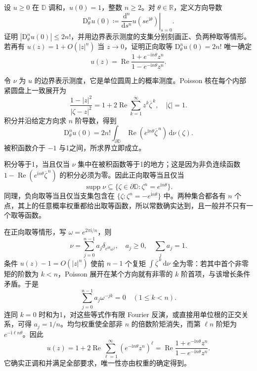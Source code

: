 \begin{exercise}[正调和函数的高阶方向导数]\label{b3:ex:15-draft-07}
设 \(u\ge0\) 在 \(\mathbb D\) 调和，\(u(0)=1\)，整数 \(n\ge2\)。对 \(\theta\in\mathbb R\)，定义方向导数
\[
 \mathrm D_\theta^n u(0)
 \coloneqq\left.\frac{\mathrm d^n}{\mathrm ds^n}u(se^{\mathrm i\theta})\right|_{s=0}.
\]
证明 \(|\mathrm D_\theta^n u(0)|\le2n!\)，并用边界表示测度的支集分别刻画正、负两种取等情形。若再有 \(u(z)=1+O(|z|^n)\) 当 \(z\to0\)，证明正向取等 \(\mathrm D_\theta^n u(0)=2n!\) 唯一确定
\[
 u(z)=\operatorname{Re}\frac{1+e^{-\mathrm in\theta}z^n}{1-e^{-\mathrm in\theta}z^n}.
\]
\end{exercise}
\begin{solution}
令 \(\nu\) 为 \(u\) 的边界表示测度，它是单位圆周上的概率测度。Poisson 核在每个内部紧圆盘上一致展开为
\[
 \frac{1-|z|^2}{|\zeta-z|^2}
 =1+2\operatorname{Re}\sum_{k=1}^\infty z^k\overline\zeta^{\,k},
 \quad |\zeta|=1.
\]
积分并沿给定方向求 \(n\) 阶导数，得到
\[
 \mathrm D_\theta^n u(0)
 =2n!\int_{\partial\mathbb D}
       \operatorname{Re}(e^{\mathrm in\theta}\overline\zeta^{\,n})\,\mathrm d\nu(\zeta).
\]
被积函数介于 \(-1\) 与1之间，所求界立即成立。

积分等于1，当且仅当 \(\nu\) 集中在被积函数等于1的地方；这是因为非负连续函数 \(1-\operatorname{Re}(e^{\mathrm in\theta}\overline\zeta^{\,n})\) 的积分必须为零。因此正向取等当且仅当
\[
 \operatorname{supp}\nu\subseteq
 \{\zeta\in\partial\mathbb D:\zeta^n=e^{\mathrm in\theta}\}.
\]
同理，负向取等当且仅当支集包含在 \(\{\zeta:\zeta^n=-e^{\mathrm in\theta}\}\) 中。两种集合都各有 \(n\) 个点，其上的任意概率权重都给出取等函数，所以常数确实达到，且一般并不只有一个取等函数。

在正向取等情形，写 \(\omega=e^{2\pi\mathrm i/n}\)，则
\[
 \nu=\sum_{j=0}^{n-1}a_j\delta_{e^{\mathrm i\theta}\omega^j},
 \quad a_j\ge0,\quad\sum_j a_j=1.
\]
条件 \(u(z)-1=O(|z|^n)\) 使前 \(n-1\) 个复矩 \(\int\overline\zeta^{\,k}\,\mathrm d\nu\) 全为零：若其中首个非零矩的阶数为 \(k<n\)，Poisson 展开在某个方向就有非零的 \(k\) 阶首项，与该增长条件矛盾。于是
\[
 \sum_{j=0}^{n-1}a_j\omega^{-jk}=0\quad(1\le k<n).
\]
连同 \(k=0\) 时和为1，对这些等式作有限 Fourier 反演，或直接用单位根的正交关系，可得 \(a_j=1/n\)。均匀权重使全部非 \(n\) 的倍数阶矩消失，而第 \(\ell n\) 阶矩为 \(e^{-\mathrm i\ell n\theta}\)。因此
\[
 u(z)=1+2\operatorname{Re}\sum_{\ell=1}^\infty
                 (e^{-\mathrm in\theta}z^n)^\ell
     =\operatorname{Re}\frac{1+e^{-\mathrm in\theta}z^n}{1-e^{-\mathrm in\theta}z^n}.
\]
它确实正调和并满足全部要求，唯一性亦由权重的确定得到。
\end{solution}

